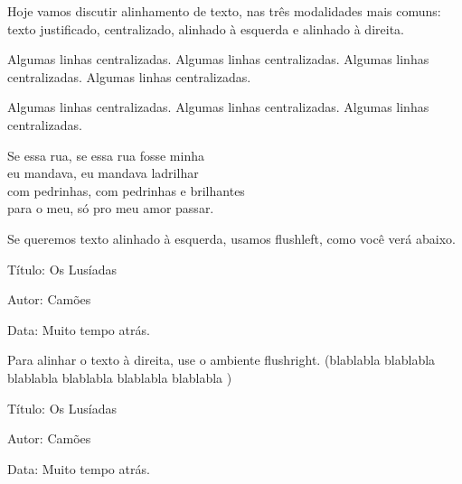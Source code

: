 \documentclass[12pt]{memoir}
\begin{document}
Hoje vamos discutir alinhamento de texto,
nas três modalidades mais comuns: texto justificado, centralizado, alinhado à esquerda e alinhado à direita.

\begin{center}
Algumas linhas centralizadas.
Algumas linhas centralizadas.
Algumas linhas centralizadas.
Algumas linhas centralizadas.

Algumas linhas centralizadas.
Algumas linhas centralizadas.
Algumas linhas centralizadas.

Se essa rua, se essa rua fosse minha \\ 
eu mandava, eu mandava ladrilhar \\
com pedrinhas, com pedrinhas e brilhantes \\
para o meu, só pro meu amor passar.
\end{center}


Se queremos texto alinhado à esquerda,
usamos flushleft, como você verá abaixo.


\begin{flushleft}
Título: Os Lusíadas

Autor: Camões

Data: Muito tempo atrás.
\end{flushleft}

Para alinhar o texto à direita, use o ambiente flushright. (blablabla blablabla blablabla blablabla blablabla blablabla )

\begin{flushright}
Título: Os Lusíadas

Autor: Camões

Data: Muito tempo atrás.
\end{flushright}
\end{document}
